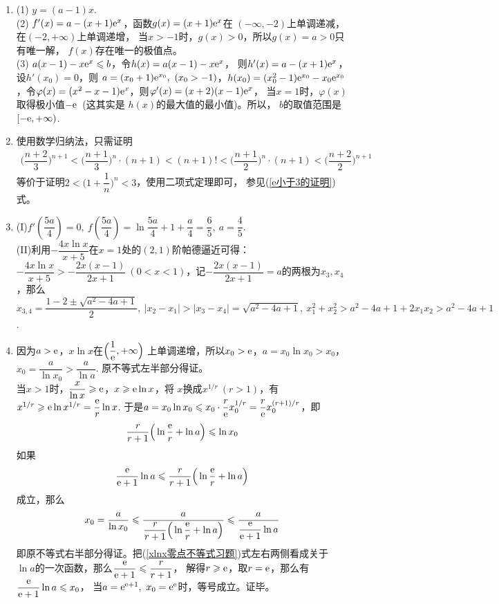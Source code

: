 \begin{enumerate}[label={\textbf{\arabic*.}},leftmargin=
    \inteval{\myenumleftmargin}pt]
\item (1) $ y=(a-1)x $. \\
(2) $ f'(x)=a-(x+1)\mathrm{e}^x $，函数$ g(x)=(x+1)\mathrm{e}^x $在
$ (-\infty,-2) $上单调递减，在$ (-2,+\infty) $上单调递增，
当$ x>-1 $时，$ g(x)>0 $，所以$ g(x)=a>0 $只有唯一解，
$ f(x) $存在唯一的极值点。\\
(3) $ a(x-1)-x\mathrm{e}^x\leqslant b $，令$ h(x)=a(x-1)-x\mathrm{e}^x $，
则$ h'(x)=a-(x+1)\mathrm{e}^x $，设$ h'(x_0)=0 $，则
$ a=(x_0+1)\e^{x_0},\ (x_0>-1) $，$ h(x_0)=(x_0^2-1)
\mathrm{e}^{x_0}-x_0\mathrm{e}^{x_0} $，令$ \varphi(x)=(x^2-x-1)
\mathrm{e}^{x} $，则$ \varphi'(x)=(x+2)(x-1)\mathrm{e}^x $，
当$ x=1 $时，$ \varphi(x) $取得极小值$ -\mathrm{e} $\, (这其实是
$ h(x) $的最大值的最小值)。所以，
$ b $的取值范围是$ [-\mathrm{e},+\infty) $.

\item 
使用数学归纳法，只需证明
\begin{gather*}
    \Big(\dfrac{n+2}{3}\Big)^{n+1}<\Big(\dfrac{n+1}{3}\Big)^{n}
    \cdot (n+1)<(n+1)!<\Big(\dfrac{n+1}{2}\Big)^{n}\cdot (n+1)<\Big(\dfrac{n+2}{2}\Big)^{n+1}
\end{gather*}
等价于证明$ 2<\Big(1+\dfrac{1}{n}\Big)^{n}<3 $，使用二项式定理即可，
参见(\ref{e小于3的证明})式。

\item 
(I)$ f'(\dfrac{5a}{4})=0,\ f(\dfrac{5a}{4})=\ln \dfrac{5a}{4}+1+\dfrac{a}{4}=\dfrac{6}{5},\ a=\dfrac{4}{5} $.\\
(II)利用$ -\dfrac{4x\ln x}{x+5} $在$ x=1 $处的$ (2,1) $阶帕德逼近可得：$ -\dfrac{4x\ln x}{x+5}>-\dfrac{2x(x-1)}{2x+1}\ (0<x<1) $，记$ -\dfrac{2x(x-1)}{2x+1}=a $的两根为$ x_3,x_4 $，那么$ x_{3,4}=\dfrac{1-2\pm \sqrt{a^2-4a+1}}{2},\  |x_2-x_1|>|x_3-x_4|=\sqrt{a^2-4a+1},\ x_1^2+x_2^2>a^2-4a+1+2x_1x_2>a^2-4a+1 $.

\item 
因为$ a>\mathrm{e} $，$ x\ln x $在$ \Big(\dfrac{1}{\mathrm{e}},+\infty\Big) $
上单调递增，所以$ x_0>\mathrm{e} $，$ a=x_0\ln x_0>x_0 $，$ x_0=\dfrac{a}{\ln x_0}
>\dfrac{a}{\ln a} $. 原不等式左半部分得证。\\
当$ x>1 $时，$ \dfrac{x}{\ln x}\geqslant \mathrm{e} $，$ x\geqslant \mathrm{e}\ln x $，将
$ x $换成$ x^{1/r}\ (r>1) $，有$ x^{1/r}\geqslant \mathrm{e}\ln x^{1/r}=\dfrac{\mathrm{e}}{r}\ln x $.
于是$ a=x_0\ln x_0\leqslant x_0\cdot \dfrac{r}{\mathrm{e}}x_0^{1/r}=\dfrac{r}{\mathrm{e}}
x_0^{(r+1)/r} $，即
\begin{gather*}
    \dfrac{r}{r+1}\Big(\ln\dfrac{\mathrm{e}}{r}+\ln a\Big)\leqslant \ln x_0
\end{gather*}
如果
\begin{gather}\label{xlnx零点不等式习题}
    \dfrac{\mathrm{e}}{\mathrm{e}+1}\ln a\leqslant \dfrac{r}{r+1}\Big(\ln\dfrac{\mathrm{e}}{r}+\ln a\Big)
\end{gather}
成立，那么
\begin{gather*}
    x_0=\dfrac{a}{\ln x_0}\leqslant \dfrac{a}{\dfrac{r}{r+1}\Big(
        \ln\dfrac{\mathrm{e}}{r}+\ln a\Big)} 
    \leqslant \dfrac{a}{\dfrac{\mathrm{e}}{\mathrm{e}+1}\ln a}
\end{gather*}
即原不等式右半部分得证。把(\ref{xlnx零点不等式习题})式左右两侧看成关于
$ \ln a $的一次函数，那么$ \dfrac{\mathrm{e}}{\mathrm{e}+1}\leqslant \dfrac{r}{r+1} $，
解得$ r\geqslant \mathrm{e} $，取$ r=\mathrm{e} $，那么有$ \dfrac{\mathrm{e}}{\mathrm{e}+1}\ln a\leqslant x_0 $，
当$ a=\e^{\e+1},\ x_0=\e^{\e} $时，等号成立。证毕。


\end{enumerate}
